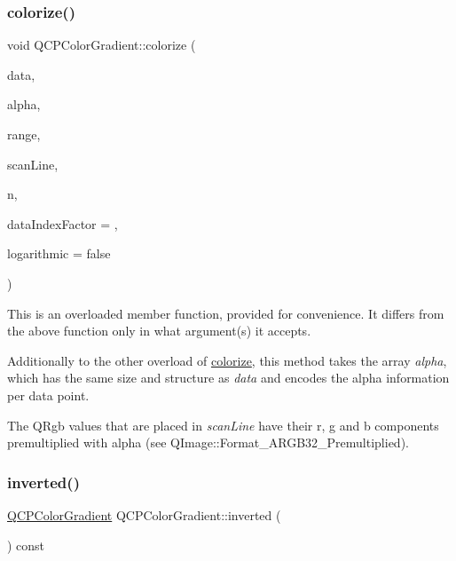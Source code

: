 \subsubsection{\texorpdfstring{colorize()}{colorize()}\hspace{0.1cm}{\footnotesize\ttfamily [2/2]}}
{\footnotesize\ttfamily void Q\+C\+P\+Color\+Gradient\+::colorize (\begin{DoxyParamCaption}\item[{const double $\ast$}]{data,  }\item[{const unsigned char $\ast$}]{alpha,  }\item[{const \hyperlink{class_q_c_p_range}{Q\+C\+P\+Range} \&}]{range,  }\item[{Q\+Rgb $\ast$}]{scan\+Line,  }\item[{int}]{n,  }\item[{int}]{data\+Index\+Factor = {},  }\item[{bool}]{logarithmic = {\ttfamily false} }\end{DoxyParamCaption})}

This is an overloaded member function, provided for convenience. It differs from the above function only in what argument(s) it accepts.

Additionally to the other overload of \hyperlink{class_q_c_p_color_gradient_aaf423ceb943e177b0ed2c48c811d83dc}{colorize}, this method takes the array {\itshape alpha}, which has the same size and structure as {\itshape data} and encodes the alpha information per data point.

The Q\+Rgb values that are placed in {\itshape scan\+Line} have their r, g and b components premultiplied with alpha (see Q\+Image\+::\+Format\+\_\+\+A\+R\+G\+B32\+\_\+\+Premultiplied). \mbox{\label{class_q_c_p_color_gradient_a9f72f501de429829ec446333316decda}} 
\subsubsection{\texorpdfstring{inverted()}{inverted()}}
{\footnotesize\ttfamily \hyperlink{class_q_c_p_color_gradient}{Q\+C\+P\+Color\+Gradient} Q\+C\+P\+Color\+Gradient\+::inverted (\begin{DoxyParamCaption}{ }\end{DoxyParamCaption}) const}

